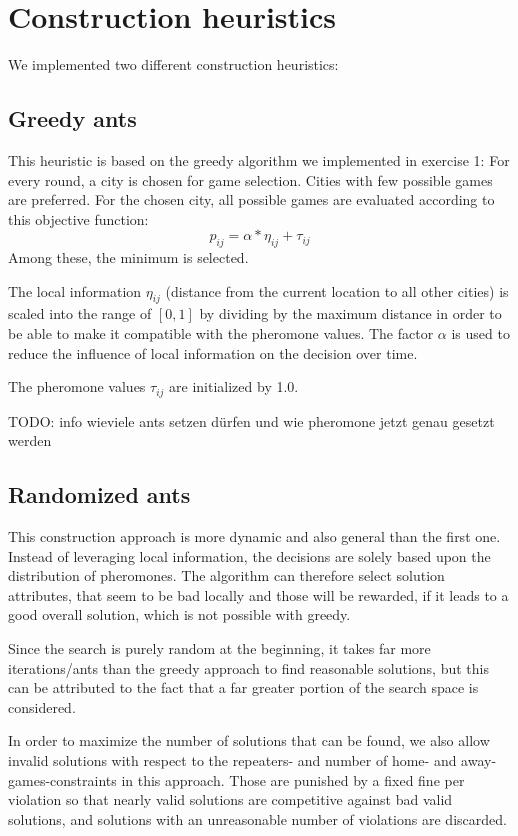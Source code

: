 \section{Construction heuristics}

We implemented two different construction heuristics:

\subsection{Greedy ants}
This heuristic is based on the greedy algorithm we implemented in exercise 1: For every round, a city is chosen for game selection.
Cities with few possible games are preferred.
For the chosen city, all possible games are evaluated according to this objective function:
$$ p_{ij} = \alpha * \eta_{ij} + \tau_{ij}  $$
Among these, the minimum is selected.

The local information $\eta_{ij}$ (distance from the current location to all other cities) is scaled into the range of $[0,1]$ by dividing by the maximum distance in order to be able to make it compatible with the pheromone values.
The factor $\alpha$ is used to reduce the influence of local information on the decision over time.

The pheromone values $\tau_{ij}$ are initialized by 1.0.

TODO: info wieviele ants setzen dürfen und wie pheromone jetzt genau gesetzt werden

\subsection{Randomized ants}

This construction approach is more dynamic and also general than the first one.
Instead of leveraging local information, the decisions are solely based upon the distribution of pheromones. 
The algorithm can therefore select solution attributes, that seem to be bad locally and those will be rewarded, if it leads to a good overall solution, which is not possible with greedy.

Since the search is purely random at the beginning, it takes far more iterations/ants than the greedy approach to find reasonable solutions, but this can be attributed to the fact that a far greater portion of the search space is considered. 

In order to maximize the number of solutions that can be found, we also allow invalid solutions with respect to the repeaters- and number of home- and away-games-constraints in this approach.
Those are punished by a fixed fine per violation so that nearly valid solutions are competitive against bad valid solutions, and solutions with an unreasonable number of violations are discarded.

